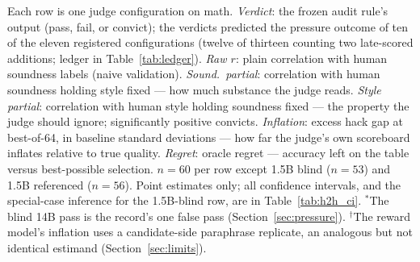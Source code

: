\documentclass[11pt]{article}
\begin{document}
\begin{table}[t!]
{Each row is one judge configuration on math.
\emph{Verdict}: the frozen audit rule's output (pass, fail, or convict); the verdicts predicted the pressure outcome of ten of the eleven registered configurations (twelve of thirteen counting two late-scored additions; ledger in Table~\ref{tab:ledger}).
\emph{Raw $r$}: plain correlation with human soundness labels (naive validation).
\emph{Sound.\ partial}: correlation with human soundness holding style fixed --- how much substance the judge reads.
\emph{Style partial}: correlation with human style holding soundness fixed --- the property the judge should ignore; significantly positive convicts.
\emph{Inflation}: excess hack gap at best-of-64, in baseline standard deviations --- how far the judge's own scoreboard inflates relative to true quality.
\emph{Regret}: oracle regret --- accuracy left on the table versus best-possible selection.
$n{=}60$ per row except 1.5B blind ($n{=}53$) and 1.5B referenced ($n{=}56$).
Point estimates only; all confidence intervals, and the special-case inference for the 1.5B-blind row, are in Table~\ref{tab:h2h_ci}.
$^{*}$The blind 14B pass is the record's one false pass (Section~\ref{sec:pressure}).
$^{\dagger}$The reward model's inflation uses a candidate-side paraphrase replicate, an analogous but not identical estimand (Section~\ref{sec:limits}).}
\label{tab:h2h}
\end{table}













\end{document}

